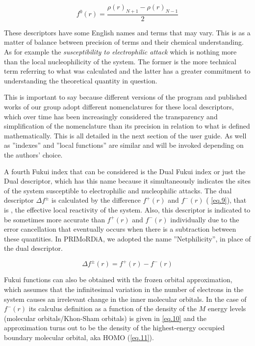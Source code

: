\documentclass[a4paper,11pt]{refart}
\begin{document}
	\begin{equation}
	f^{0}(r) = \frac{\rho(r)_{N+1} -\rho (r)_{N-1}}{2}
	\label{eq.8}
	\end{equation}

	These descriptors have some English names and terms that may vary. This is as a matter of balance between precision of terms and their chemical understanding. As for example the \textit{susceptibility to electrophilic attack} which is nothing more than the local nucleophilicity of the system. The former is the more technical term referring to what was calculated and the latter has a greater commitment to understanding the theoretical quantity in question.

	This is important to say because different versions of the program and published works of our group adopt different nomenclatures for these local descriptors, which over time has been increasingly considered the transparency and simplification of the nomenclature than its precision in relation to what is defined mathematically. This is all detailed in the next section of the user guide. As well as ''indexes'' and ''local functions'' are similar and will be invoked depending on the authors' choice.

	A fourth Fukui index that can be considered is the Dual Fukui index or just the Dual descriptor, which has this name because it simultaneously indicates the sites of the system susceptible to electrophilic and nucleophilic attacks. The dual descriptor $\Delta f^{\pm}$ is calculated by the difference $f^{+}(r)$ and $f^{-}(r)$ ( \autoref{eq.9}), that is , the effective local reactivity of the system. Also, this descriptor is indicated to be sometimes more accurate than $f^{+}(r)$ and $f^{-}(r)$ individually due to the error cancellation that eventually occurs when there is a subtraction between these quantities\cite{martinez2015dual}. In PRIMoRDiA, we adopted the name ''Netphilicity'', in place of the dual descriptor.

	\begin{equation}
	\Delta f^{\pm}(r) = f^{+}(r) - f^{-}(r)
	\label{eq.9}
	\end{equation}

	Fukui functions can also be obtained with the frozen orbital approximation, which assumes that the infinitesimal variation in the number of electrons in the system causes an irrelevant change in the inner molecular orbitals. In the case of $f^{-}(r)$ its calculus definition as a function of the density of the $M$ energy levels (molecular orbitals/Khon-Sham orbitals) is given in \autoref{eq.10} and the approximation turns out to be the density of the highest-energy occupied boundary molecular orbital, aka HOMO (\autoref{eq.11}).
\end{document}
